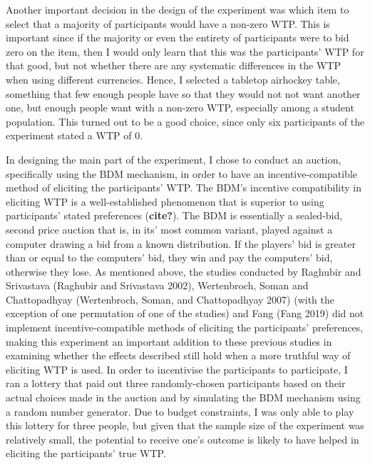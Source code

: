 \documentclass[
]{report}
\begin{document}
Another important decision in the design of the experiment was which
item to select that a majority of participants would have a non-zero
WTP. This is important since if the majority or even the entirety of
participants were to bid zero on the item, then I would only learn that
this was the participants' WTP for that good, but not whether there are
any systematic differences in the WTP when using different currencies.
Hence, I selected a tabletop airhockey table, something that few enough
people have so that they would not not want another one, but enough
people want with a non-zero WTP, especially among a student population.
This turned out to be a good choice, since only six participants of the
experiment stated a WTP of 0.

In designing the main part of the experiment, I chose to conduct an
auction, specifically using the BDM mechanism, in order to have an
incentive-compatible method of eliciting the participants' WTP. The
BDM's incentive compatibility in eliciting WTP is a well-established
phenomenon that is superior to using participants' stated preferences
(\textbf{cite?}). The BDM is essentially a sealed-bid, second price
auction that is, in its' most common variant, played against a computer
drawing a bid from a known distribution. If the players' bid is greater
than or equal to the computers' bid, they win and pay the computers'
bid, otherwise they lose. As mentioned above, the studies conducted by
Raghubir and Srivastava (Raghubir and Srivastava 2002), Wertenbroch,
Soman and Chattopadhyay (Wertenbroch, Soman, and Chattopadhyay 2007)
(with the exception of one permutation of one of the studies) and Fang
(Fang 2019) did not implement incentive-compatible methods of eliciting
the participants' preferences, making this experiment an important
addition to these previous studies in examining whether the effects
described still hold when a more truthful way of eliciting WTP is used.
In order to incentivise the participants to participate, I ran a lottery
that paid out three randomly-chosen participants based on their actual
choices made in the auction and by simulating the BDM mechanism using a
random number generator. Due to budget constraints, I was only able to
play this lottery for three people, but given that the sample size of
the experiment was relatively small, the potential to receive one's
outcome is likely to have helped in eliciting the participants' true
WTP.
\end{document}
